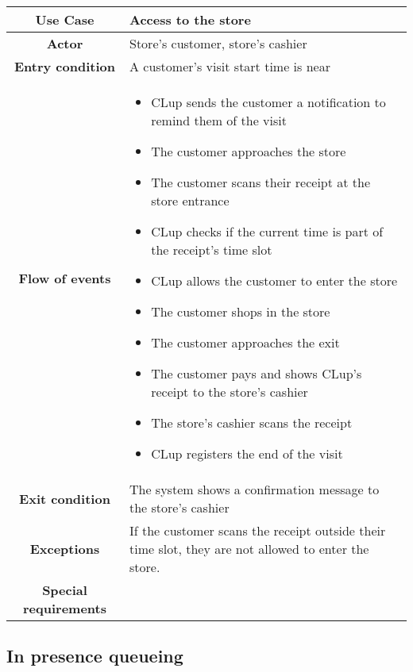 \documentclass[../../main.tex]{subfiles}
\begin{document}
    \begin{table}[H]
      \centering
        \begin{tabular}{c m{}}
        \hline
        \textbf{Use Case} & Access to the store\\ \hline
        \textbf{Actor} & Store's customer, store's cashier\\ \hline
        \textbf{Entry condition} & A customer's visit start time is near\\  \hline
        \textbf{Flow of events} & \begin{itemize}
                                    \item CLup sends the customer a notification to remind them of the visit
                                    \item The customer approaches the store
                                    \item The customer scans their receipt at the store entrance
                                    \item CLup checks if the current time is part of the receipt's time slot
                                    \item CLup allows the customer to enter the store
                                    \item The customer shops in the store
                                    \item The customer approaches the exit
                                    \item The customer pays and shows CLup's receipt to the store's cashier
                                    \item The store's cashier scans the receipt
                                    \item CLup registers the end of the visit
                                  \end{itemize}\\ \hline
        \textbf{Exit condition} & The system shows a confirmation message to the store's cashier \\ \hline
        \textbf{Exceptions} & If the customer scans the receipt outside their time slot, they are not allowed to enter the store. \\ \hline
        \textbf{Special requirements} &\\ \hline
        \end{tabular}
    \end{table}

    \subsection{In presence queueing}
\end{document}

